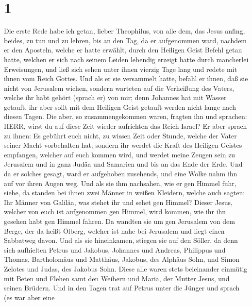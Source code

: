 \hypertarget{section}{%
\section{1}\label{section}}

 Die erste Rede habe ich getan, lieber Theophilus, von alle
dem, das Jesus anfing, beides, zu tun und zu lehren,  bis an
den Tag, da er aufgenommen ward, nachdem er den Aposteln, welche er
hatte erwählt, durch den Heiligen Geist Befehl getan hatte, 
welchen er sich nach seinem Leiden lebendig erzeigt hatte durch
mancherlei Erweisungen, und ließ sich sehen unter ihnen vierzig Tage
lang und redete mit ihnen vom Reich Gottes.  Und als er sie
versammelt hatte, befahl er ihnen, daß sie nicht von Jerusalem wichen,
sondern warteten auf die Verheißung des Vaters, welche ihr habt gehört
(sprach er) von mir;  denn Johannes hat mit Wasser getauft,
ihr aber sollt mit dem Heiligen Geist getauft werden nicht lange nach
diesen Tagen.  Die aber, so zusammengekommen waren, fragten
ihn und sprachen: HERR, wirst du auf diese Zeit wieder aufrichten das
Reich Israel?  Er aber sprach zu ihnen: Es gebührt euch
nicht, zu wissen Zeit oder Stunde, welche der Vater seiner Macht
vorbehalten hat;  sondern ihr werdet die Kraft des Heiligen
Geistes empfangen, welcher auf euch kommen wird, und werdet meine Zeugen
sein zu Jerusalem und in ganz Judäa und Samarien und bis an das Ende der
Erde.  Und da er solches gesagt, ward er aufgehoben
zusehends, und eine Wolke nahm ihn auf vor ihren Augen weg.
 Und als sie ihm nachsahen, wie er gen Himmel fuhr, siehe,
da standen bei ihnen zwei Männer in weißen Kleidern, 
welche auch sagten: Ihr Männer von Galiläa, was stehet ihr und sehet gen
Himmel? Dieser Jesus, welcher von euch ist aufgenommen gen Himmel, wird
kommen, wie ihr ihn gesehen habt gen Himmel fahren.  Da
wandten sie um gen Jerusalem von dem Berge, der da heißt Ölberg, welcher
ist nahe bei Jerusalem und liegt einen Sabbatweg davon. 
Und als sie hineinkamen, stiegen sie auf den Söller, da denn sich
aufhielten Petrus und Jakobus, Johannes und Andreas, Philippus und
Thomas, Bartholomäus und Matthäus, Jakobus, des Alphäus Sohn, und Simon
Zelotes und Judas, des Jakobus Sohn.  Diese alle waren
stets beieinander einmütig mit Beten und Flehen samt den Weibern und
Maria, der Mutter Jesus, und seinen Brüdern.  Und in den
Tagen trat auf Petrus unter die Jünger und sprach (es war aber eine
